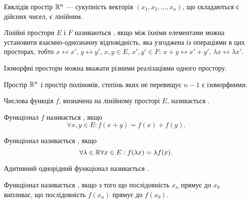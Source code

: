 \begin{example}
Евклідів простір $\mathbb{R}^n$ --- сукупність векторів
$(x_1, x_2, \dots, x_n)$, що складаються с дійсних чисел, є лінійним.
\end{example}

\begin{definition}
Лінійні простори $E$ і $F$ називаються
, якщо між їхніми елементами можна
установити взаємно-однозначну відповідність, яка
узгоджена із операціями в цих просторах, тобто $x \leftrightarrow x'$,
$y \leftrightarrow y'$, $x, y \in E$, $x', y' \in F$: $x + y \leftrightarrow x' + y'$, $\lambda x \leftrightarrow \lambda x'$.
\end{definition}

\begin{remark}
Ізоморфні простори можна вважати різними реалізаціями
одного простору.
\end{remark}

\begin{example}
Простір $\mathbb{R}^n$ і простір поліномів, степінь яких
не перевищує $n - 1$ є ізоморфними.
\end{example}

\begin{definition}
Числова функція $f$, визначена на лінійному
просторі $E$, називається .
\end{definition}

\begin{definition}
Функціонал $f$ називається , якщо
\begin{equation*}
    \forall x, y \in E: f(x + y) = f(x) + f (y).
\end{equation*}
\end{definition}

\begin{definition}
Функціонал називається , якщо
\begin{equation*}
    \forall \lambda \in \mathbb{R} \forall x \in E: f(\lambda x) = \lambda f(x).
\end{equation*}
\end{definition}

\begin{definition}
Адитивний однорідний функціонал називається .
\end{definition}

\begin{definition}
Функціонал називається ,
якщо з того що послідовність $x_n$ прямує до $x_0$
випливає, що послідовність $f(x_n)$ прямує до $f(x_0)$.
\end{definition}

